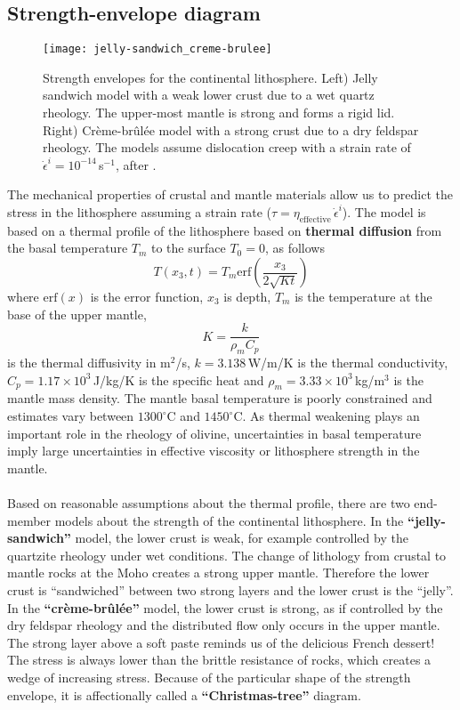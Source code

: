 \documentclass[letterpaper,12pt,]{memoir}
\begin{document}
\subsection{Strength-envelope diagram}

\begin{figure}[p]
\texttt{[image: jelly-sandwich\_creme-brulee]}
\caption{Strength envelopes for the continental lithosphere. Left) Jelly sandwich model with a weak lower crust due to a wet quartz rheology. The upper-most mantle is strong and forms a rigid lid. Right) Cr\`{e}me-br\^{u}l\'{e}e model with a strong crust due to a dry feldspar rheology. The models assume dislocation creep with a strain rate of $\dot{\epsilon}^i=10^{-14}\,$s$^{-1}$, after \cite{burgmann&dresen08}.}
\label{fig:strenth-envelope-continent}
\end{figure}
%
The mechanical properties of crustal and mantle materials allow us to predict the stress in the lithosphere assuming a strain rate ($\tau=\eta_\text{effective}\,\dot{\epsilon}^i$). The model is based on a thermal profile of the lithosphere based on \textbf{thermal diffusion} from the basal temperature $T_m$ to the surface $T_0=0$, as follows
\begin{equation}
T(x_3,t)=T_m\text{erf}\left(\frac{x_3}{2\sqrt{K t}}\right)
\end{equation}
where $\text{erf}(x)$ is the error function, $x_3$ is depth, $T_m$ is the temperature at the base of the upper mantle, 
\begin{equation}
K=\frac{k}{\rho_mC_p}
\end{equation}
is the thermal diffusivity in m$^2$/s, $k=3.138\,$W/m/K is the thermal conductivity, $C_p=1.17\times10^{3}\,$J/kg/K is the specific heat and $\rho_m=3.33\times10^{3}\,$kg/m$^3$ is the mantle mass density. The mantle basal temperature is poorly constrained and estimates vary between $1300^\circ$C and $1450^\circ$C. As thermal weakening plays an important role in the rheology of olivine, uncertainties in basal temperature imply large uncertainties in effective viscosity or lithosphere strength in the mantle.\\
%
\\
Based on reasonable assumptions about the thermal profile, there are two end-member models about the strength of the continental lithosphere. In the \textbf{``jelly-sandwich''} model, the lower crust is weak, for example controlled by the quartzite rheology under wet conditions. The change of lithology from crustal to mantle rocks at the Moho creates a strong upper mantle. Therefore the lower crust is ``sandwiched'' between two strong layers and the lower crust is the ``jelly''. In the \textbf{``cr\`{e}me-br\^{u}l\'{e}e''} model, the lower crust is strong, as if controlled by the dry feldspar rheology and the distributed flow only occurs in the upper mantle. The strong layer above a soft paste reminds us of the delicious French dessert! The stress is always lower than the brittle resistance of rocks, which creates a wedge of increasing stress. Because of the particular shape of the strength envelope, it is affectionally called a \textbf{``Christmas-tree''} diagram.
\end{document}
